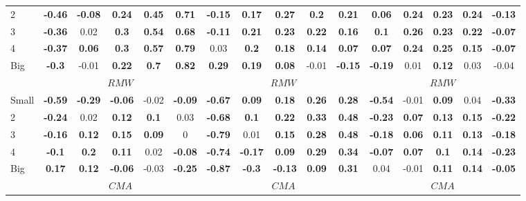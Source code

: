 \begin{table}[H]
\begin{tabular}{lccccc|ccccc|ccccc}
2 & \textbf{-0.46} & \textbf{-0.08} & \textbf{0.24} & \textbf{0.45} & \textbf{0.71} & \textbf{-0.15} & \textbf{0.17} & \textbf{0.27} & \textbf{0.2} & \textbf{0.21} & \textbf{0.06} & \textbf{0.24} & \textbf{0.23} & \textbf{0.24} & \textbf{-0.13} \\
3 & \textbf{-0.36} & 0.02 & \textbf{0.3} & \textbf{0.54} & \textbf{0.68} & \textbf{-0.11} & \textbf{0.21} & \textbf{0.23} & \textbf{0.22} & \textbf{0.16} & \textbf{0.1} & \textbf{0.26} & \textbf{0.23} & \textbf{0.22} & \textbf{-0.07} \\
4 & \textbf{-0.37} & \textbf{0.06} & \textbf{0.3} & \textbf{0.57} & \textbf{0.79} & 0.03 & \textbf{0.2} & \textbf{0.18} & \textbf{0.14} & \textbf{0.07} & \textbf{0.07} & \textbf{0.24} & \textbf{0.25} & \textbf{0.15} & \textbf{-0.07} \\
Big & \textbf{-0.3} & -0.01 & \textbf{0.22} & \textbf{0.7} & \textbf{0.82} & \textbf{0.29} & \textbf{0.19} & \textbf{0.08} & -0.01 & \textbf{-0.15} & \textbf{-0.19} & 0.01 & \textbf{0.12} & 0.03 & -0.04 \\
 & \multicolumn{5}{c|}{$RMW$} & \multicolumn{5}{c|}{$RMW$} & \multicolumn{5}{c}{$RMW$} \\
Small & \textbf{-0.59} & \textbf{-0.29} & \textbf{-0.06} & -0.02 & \textbf{-0.09} & \textbf{-0.67} & \textbf{0.09} & \textbf{0.18} & \textbf{0.26} & \textbf{0.28} & \textbf{-0.54} & -0.01 & \textbf{0.09} & 0.04 & \textbf{-0.33} \\
2 & \textbf{-0.24} & 0.02 & \textbf{0.12} & \textbf{0.1} & 0.03 & \textbf{-0.68} & \textbf{0.1} & \textbf{0.22} & \textbf{0.33} & \textbf{0.48} & \textbf{-0.23} & \textbf{0.07} & \textbf{0.13} & \textbf{0.15} & \textbf{-0.22} \\
3 & \textbf{-0.16} & \textbf{0.12} & \textbf{0.15} & \textbf{0.09} & 0 & \textbf{-0.79} & 0.01 & \textbf{0.15} & \textbf{0.28} & \textbf{0.48} & \textbf{-0.18} & \textbf{0.06} & \textbf{0.11} & \textbf{0.13} & \textbf{-0.18} \\
4 & \textbf{-0.1} & \textbf{0.2} & \textbf{0.11} & 0.02 & \textbf{-0.08} & \textbf{-0.74} & \textbf{-0.17} & \textbf{0.09} & \textbf{0.29} & \textbf{0.34} & \textbf{-0.07} & \textbf{0.07} & \textbf{0.1} & \textbf{0.14} & \textbf{-0.23} \\
Big & \textbf{0.17} & \textbf{0.12} & \textbf{-0.06} & -0.03 & \textbf{-0.25} & \textbf{-0.87} & \textbf{-0.3} & \textbf{-0.13} & \textbf{0.09} & \textbf{0.31} & 0.04 & -0.01 & \textbf{0.11} & \textbf{0.14} & \textbf{-0.05} \\
 & \multicolumn{5}{c|}{$CMA$} & \multicolumn{5}{c|}{$CMA$} & \multicolumn{5}{c}{$CMA$} \\

\end{tabular}
\end{table}
